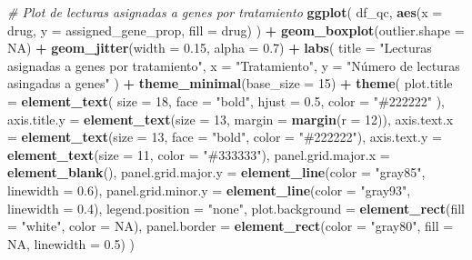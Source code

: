 \documentclass[
  spanish,
  11pt,
]{article}
\newenvironment{Shaded}{\begin{snugshade}}{\end{snugshade}}
\newcommand{\AttributeTok}[1]{\textcolor[rgb]{0.13,0.29,0.53}{#1}}
\newcommand{\CommentTok}[1]{\textcolor[rgb]{0.56,0.35,0.01}{\textit{#1}}}
\newcommand{\ConstantTok}[1]{\textcolor[rgb]{0.56,0.35,0.01}{#1}}
\newcommand{\DecValTok}[1]{\textcolor[rgb]{0.00,0.00,0.81}{#1}}
\newcommand{\FloatTok}[1]{\textcolor[rgb]{0.00,0.00,0.81}{#1}}
\newcommand{\FunctionTok}[1]{\textcolor[rgb]{0.13,0.29,0.53}{\textbf{#1}}}
\newcommand{\NormalTok}[1]{#1}
\newcommand{\SpecialCharTok}[1]{\textcolor[rgb]{0.81,0.36,0.00}{\textbf{#1}}}
\newcommand{\StringTok}[1]{\textcolor[rgb]{0.31,0.60,0.02}{#1}}
\begin{document}
\begin{Shaded}
\begin{Highlighting}[]
\CommentTok{\# Plot de lecturas asignadas a genes por tratamiento}
\FunctionTok{ggplot}\NormalTok{(}
\NormalTok{  df\_qc,}
  \FunctionTok{aes}\NormalTok{(}\AttributeTok{x =}\NormalTok{ drug, }\AttributeTok{y =}\NormalTok{ assigned\_gene\_prop, }\AttributeTok{fill =}\NormalTok{ drug)}
\NormalTok{) }\SpecialCharTok{+}
  \FunctionTok{geom\_boxplot}\NormalTok{(}\AttributeTok{outlier.shape =} \ConstantTok{NA}\NormalTok{) }\SpecialCharTok{+}
  \FunctionTok{geom\_jitter}\NormalTok{(}\AttributeTok{width =} \FloatTok{0.15}\NormalTok{, }\AttributeTok{alpha =} \FloatTok{0.7}\NormalTok{) }\SpecialCharTok{+}
  \FunctionTok{labs}\NormalTok{(}
    \AttributeTok{title =} \StringTok{"Lecturas asignadas a genes por tratamiento"}\NormalTok{,}
    \AttributeTok{x =} \StringTok{"Tratamiento"}\NormalTok{,}
    \AttributeTok{y =} \StringTok{"Número de lecturas asingadas a genes"}
\NormalTok{  ) }\SpecialCharTok{+}
  \FunctionTok{theme\_minimal}\NormalTok{(}\AttributeTok{base\_size =} \DecValTok{15}\NormalTok{) }\SpecialCharTok{+}
  \FunctionTok{theme}\NormalTok{(}
    \AttributeTok{plot.title =} \FunctionTok{element\_text}\NormalTok{(}
      \AttributeTok{size =} \DecValTok{18}\NormalTok{,}
      \AttributeTok{face =} \StringTok{"bold"}\NormalTok{,}
      \AttributeTok{hjust =} \FloatTok{0.5}\NormalTok{,}
      \AttributeTok{color =} \StringTok{"\#222222"}
\NormalTok{    ),}
    \AttributeTok{axis.title.y =} \FunctionTok{element\_text}\NormalTok{(}\AttributeTok{size =} \DecValTok{13}\NormalTok{, }\AttributeTok{margin =} \FunctionTok{margin}\NormalTok{(}\AttributeTok{r =} \DecValTok{12}\NormalTok{)),}
    \AttributeTok{axis.text.x =} \FunctionTok{element\_text}\NormalTok{(}\AttributeTok{size =} \DecValTok{13}\NormalTok{, }\AttributeTok{face =} \StringTok{"bold"}\NormalTok{, }\AttributeTok{color =} \StringTok{"\#222222"}\NormalTok{),}
    \AttributeTok{axis.text.y =} \FunctionTok{element\_text}\NormalTok{(}\AttributeTok{size =} \DecValTok{11}\NormalTok{, }\AttributeTok{color =} \StringTok{"\#333333"}\NormalTok{),}
    \AttributeTok{panel.grid.major.x =} \FunctionTok{element\_blank}\NormalTok{(),}
    \AttributeTok{panel.grid.major.y =} \FunctionTok{element\_line}\NormalTok{(}\AttributeTok{color =} \StringTok{"gray85"}\NormalTok{, }\AttributeTok{linewidth =} \FloatTok{0.6}\NormalTok{),}
    \AttributeTok{panel.grid.minor.y =} \FunctionTok{element\_line}\NormalTok{(}\AttributeTok{color =} \StringTok{"gray93"}\NormalTok{, }\AttributeTok{linewidth =} \FloatTok{0.4}\NormalTok{),}
    \AttributeTok{legend.position =} \StringTok{"none"}\NormalTok{,}
    \AttributeTok{plot.background =} \FunctionTok{element\_rect}\NormalTok{(}\AttributeTok{fill =} \StringTok{"white"}\NormalTok{, }\AttributeTok{color =} \ConstantTok{NA}\NormalTok{),}
    \AttributeTok{panel.border =} \FunctionTok{element\_rect}\NormalTok{(}\AttributeTok{color =} \StringTok{"gray80"}\NormalTok{, }\AttributeTok{fill =} \ConstantTok{NA}\NormalTok{, }\AttributeTok{linewidth =} \FloatTok{0.5}\NormalTok{)}
\NormalTok{  )}
\end{Highlighting}
\end{Shaded}
\end{document}
